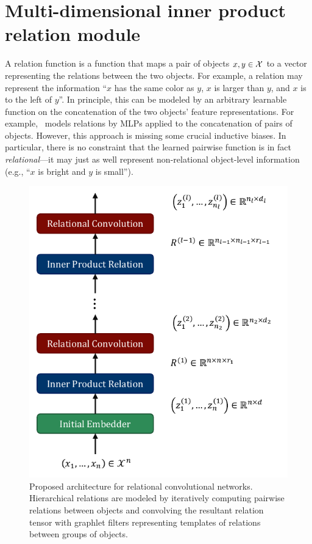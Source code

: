 \section{Multi-dimensional inner product relation module}\label{sec:mdipr}

A relation function is a function that maps a pair of objects $x, y \in {\mathcal{X}}$ to a vector representing the relations between the two objects. For example, a relation may represent the information ``$x$ has the same color as $y$, $x$ is larger than $y$, and $x$ is to the left of $y$''. In principle, this can be modeled by an arbitrary learnable function on the concatenation of the two objects' feature representations. For example,~\citet{santoroSimpleNeural2017} models relations by MLPs applied to the concatenation of pairs of objects. However, this approach is missing some crucial inductive biases. In particular, there is no constraint that the learned pairwise function is in fact \textit{relational}---it may just as well represent non-relational object-level information (e.g., ``$x$ is bright and $y$ is small'').%

\begin{figure}
    \centering
    \includegraphics[width=.48\textwidth]{figs/relconv_architecture.pdf}
    \caption{Proposed architecture for relational convolutional networks. Hierarchical relations are modeled by iteratively computing pairwise relations between objects and convolving the resultant relation tensor with graphlet filters representing templates of relations between groups of objects.
    }\label{fig:relconv_architecture}
\end{figure}

